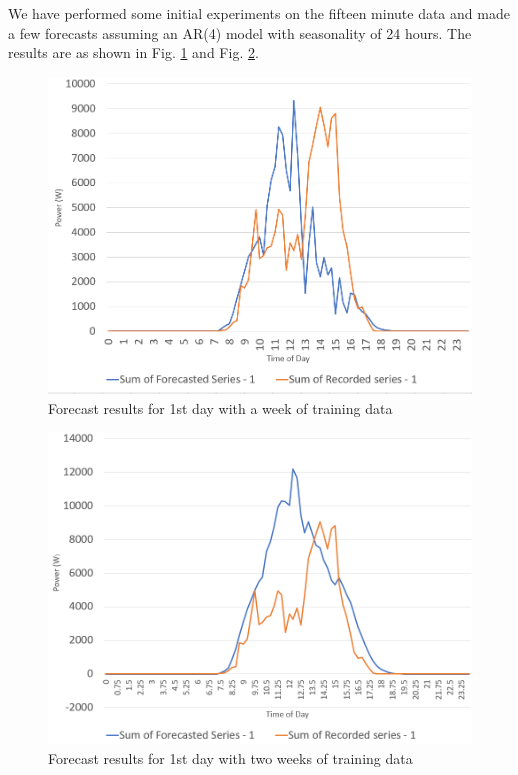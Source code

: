 \documentclass[journal]{IEEEtran}
\begin{document}
We have performed some initial experiments on the fifteen minute data and made a few forecasts assuming an AR(4) model with seasonality of 24 hours. The results are as shown in Fig. \ref{fig5} and Fig. \ref{fig6}.

\begin{figure}[htpb]
	\centering
	\includegraphics[scale=0.35]{ForecastResultsOneWeek.png}
	\caption{Forecast results for 1st day with a week of training data}
	\label{fig5} %
\end{figure}

\begin{figure}[htpb]
	\centering
	\includegraphics[scale=0.35]{ForecastResultsTwoWeek.png}
	\caption{Forecast results for 1st day with two weeks of training data}
	\label{fig6} %
\end{figure}
\end{document}
